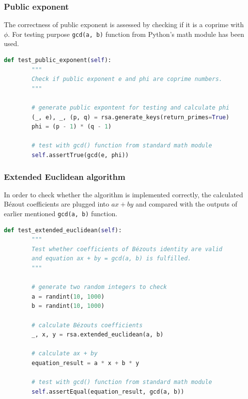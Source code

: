 \documentclass{article}
\begin{document}
\normalsize

\subsubsection{Public exponent}
The correctness of public exponent is assessed by checking if it is a coprime with $\phi$.
For testing purpose \texttt{gcd(a, b)} function from Python's math module has been used.

\small

\begin{lstlisting}[language=Python]
    def test_public_exponent(self):
        """
        Check if public exponent e and phi are coprime numbers.
        """

        # generate public expontent for testing and calculate phi
        (_, e), _, (p, q) = rsa.generate_keys(return_primes=True)
        phi = (p - 1) * (q - 1)

        # test with gcd() function from standard math module
        self.assertTrue(gcd(e, phi))
\end{lstlisting}

\normalsize

\subsubsection{Extended Euclidean algorithm}
In order to check whether the algorithm is implemented correctly, the calculated Bézout coefficients
are plugged into $ax + by$ and compared with the outputs of earlier mentioned \texttt{gcd(a, b)} function.

\newpage

\small

\begin{lstlisting}[language=Python]
    def test_extended_euclidean(self):
        """
        Test whether coefficients of Bézouts identity are valid
        and equation ax + by = gcd(a, b) is fulfilled.
        """

        # generate two random integers to check
        a = randint(10, 1000)
        b = randint(10, 1000)

        # calculate Bézouts coefficients
        _, x, y = rsa.extended_euclidean(a, b)

        # calculate ax + by
        equation_result = a * x + b * y

        # test with gcd() function from standard math module
        self.assertEqual(equation_result, gcd(a, b))
\end{lstlisting}
\end{document}
